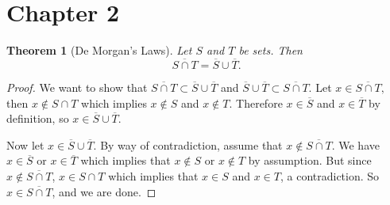\documentclass{article}
\newtheorem{theorem}{Theorem}
\begin{document}
\section*{Chapter 2}
\begin{theorem}[De Morgan's Laws]
     Let $S$ and $T$ be sets. Then 
     \[
     \overline{S \cap  T} = \overline{S} \cup \overline{T}.
     \]
\end{theorem}

\begin{proof}
    We want to show that $\overline{S \cap T} \subset \overline{S} \cup \overline{T}$ and $\overline{S} \cup \overline{T} \subset \overline{S \cap T}.$ 
    Let $x \in \overline{S \cap T},$ then $x \notin S \cap T$ which implies $x \notin S$ and $x \notin T$. Therefore  $x \in \overline{S}$ and $x \in \overline{T}$ by definition, so $x \in \overline{S} \cup \overline{T}.$

    Now let $x \in \overline{S} \cup \overline{T}.$ By way of contradiction, assume that $x \notin \overline{S \cap T}.$ We have $x \in \overline{S}$ or $x \in \overline{T }$ which implies that $x \notin S$ or $x \notin T$ by assumption. But since $x \notin \overline{S \cap T}$, $x \in S \cap T$ which implies that $x \in S$ and $x \in T$, a contradiction. So $x \in \overline{S \cap T}$, and we are done.

\end{proof}
    
\end{document}
